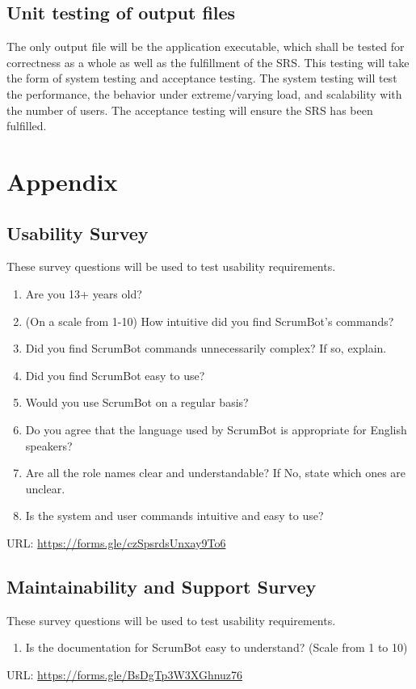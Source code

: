 \documentclass[12pt, titlepage]{article}
\begin{document}
\subsection{Unit testing of output files}		
The only output file will be the application executable, which shall be tested for correctness as a whole as well as the fulfillment of the SRS. This testing will take the form of system testing and acceptance testing. The system testing will test the performance, the behavior under extreme/varying load, and scalability with the number of users. The acceptance testing will ensure the SRS has been fulfilled.



\newpage

\section{Appendix}


\subsection{Usability Survey}
These survey questions will be used to test usability requirements.
\begin{enumerate}
    \item Are you 13+ years old?
    \item (On a scale from 1-10) How intuitive did you find ScrumBot's commands?
    \item Did you find ScrumBot commands unnecessarily complex? If so, explain.
    \item Did you find ScrumBot easy to use?
    \item Would you use ScrumBot on a regular basis?
    \item Do you agree that the language used by ScrumBot is appropriate for English speakers?
    \item Are all the role names clear and understandable? If No, state which ones are unclear.
    \item Is the system and user commands intuitive and easy to use?
\end{enumerate}
URL: \url{https://forms.gle/czSpsrdsUnxay9To6}
 
\subsection{Maintainability and Support Survey}
These survey questions will be used to test usability requirements.
\begin{enumerate}
    \item Is the documentation for ScrumBot easy to understand? (Scale from 1 to 10)
\end{enumerate}
URL: \url{https://forms.gle/BsDgTp3W3XGhnuz76}
\end{document}
